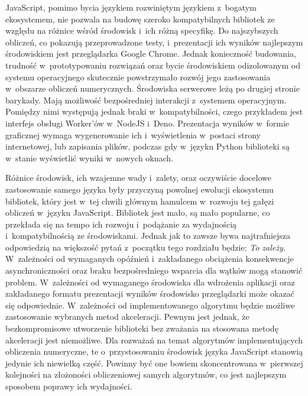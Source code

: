 JavaScript, pomimo bycia językiem rozwiniętym językiem z~bogatym ekosystemem, nie pozwala na budowę szeroko kompatybilnych bibliotek ze względu na różnice wśród środowisk i~ich różną specyfikę. Do najszybszych obliczeń, co pokazują przeprowadzone testy, i~prezentacji ich wyników najlepszym środowiskiem jest przeglądarka Google Chrome. Jednak konieczność budowania, trudność w~prototypowaniu rozwiązań oraz bycie środowiskiem odizolowanym od systemu operacyjnego skutecznie powstrzymało rozwój jego zastosowania w~obszarze obliczeń numerycznych. Środowiska serwerowe leżą po drugiej stronie barykady. Mają możliwość bezpośredniej interakcji z~systemem operacyjnym. Pomiędzy nimi występują jednak braki w~kompatybilności, czego przykładem jest interfejs obsługi Worker'ów w~NodeJS i~Deno. Prezentacja wyników w~formie graficznej wymaga wygenerowanie ich i~wyświetlenia w~postaci strony internetowej, lub zapisania plików, podczas gdy w~języku Python biblioteki są w~stanie wyświetlić wyniki w~nowych oknach.

Różnice środowisk, ich wzajemne wady i~zalety, oraz oczywiście docelowe zastosowanie samego języka były przyczyną powolnej ewolucji ekosystemu bibliotek, który jest w~tej chwili głównym hamulcem w~rozwoju tej gałęzi obliczeń w~języku JavaScript. Bibliotek jest mało, są mało popularne, co przekłada się na tempo ich rozwoju i~podążanie za wydajnością i~kompatybilnością ze środowiskami. Jednak jak to zawsze bywa najtrafniejsza odpowiedzią na większość pytań z~początku tego rozdziału będzie: \textit{To zależy}. W~zależności od wymaganych opóźnień i~zakładanego obciążenia konsekwencje asynchroniczności oraz braku bezpośredniego wsparcia dla wątków mogą stanowić problem. W~zależności od wymaganego środowiska dla wdrożenia aplikacji oraz zakładanego formatu prezentacji wyników środowisko przeglądarki może okazać się odpowiednie. W~zależności od implementowanego algorytmu będzie możliwe zastosowanie wybranych metod akceleracji. Pewnym jest jednak, że bezkompromisowe utworzenie biblioteki bez zważania na stosowana metodę akceleracji jest niemożliwe. Dla rozważań na temat algorytmów implementujących obliczenia numeryczne, te o~przystosowaniu środowisk języka JavaScript stanowią jedynie ich niewielką część. Powinny być one bowiem skoncentrowana w~pierwszej kolejności na złożoności obliczeniowej samych algorytmów, co jest najlepszym sposobem poprawy ich wydajności.

\clearpage
